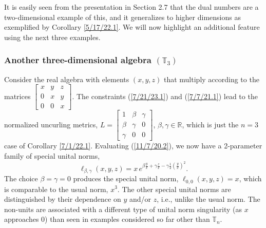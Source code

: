 \documentclass{amsart}
\numberwithin{equation}{section}
\theoremstyle{definition}
\numberwithin{theorem}{section}
\begin{document}
It is easily seen from the presentation in Section 2.7 that the dual numbers are a two-dimensional example of this, and it
generalizes to higher dimensions as exemplified by Corollary \ref{5/17/22.1}.  We will now highlight an additional feature using the next three examples.  

\subsubsection{Another three-dimensional algebra $(\mathbb{T}_3)$}Consider the real algebra with elements  $(x,y,z)$ that multiply according to the matrices $ \left[
\begin{array}{ccc}
x & y & z   \\
0 & x & y \\
0 & 0 & x  
\end{array}
\right]$.    The constraints (\ref{7/21/23.1}) and (\ref{7/7/21.1}) lead to the normalized uncurling metrics, $ L = \left[
\begin{array}{ccc}
1 & \beta & \gamma   \\
\beta & \gamma & 0 \\
\gamma & 0 & 0  
\end{array}
\right]$, $\beta,\gamma\in\mathbb{R}$, which is just the $n=3$ case of Corollary \ref{7/1/22.1}.    Evaluating (\ref{11/7/20.2}), we now have a 2-parameter family of special unital norms, \begin{equation}\label{3/31/21.3} \ell_{\beta,\gamma}(x,y,z) = x\, e^{ \beta\frac{y}{x}  +\gamma \frac{z}{x} -\gamma \frac{ 1}{2}\left(\frac{y}{x}\right)^2 }.\end{equation}    The choice $\beta = \gamma = 0$ produces the special unital norm, $\ell_{0,0}(x,y,z)= x$, which is comparable to the usual norm, $x^3$. 
 The other special unital norms are distinguished by their dependence on $y$ and/or $z$, i.e., unlike the usual norm.  The non-units are associated with a different type of unital norm singularity (as $x$ approaches 0) than seen in examples considered so far other than $\mathbb{T}_n$.
 
\end{document}
